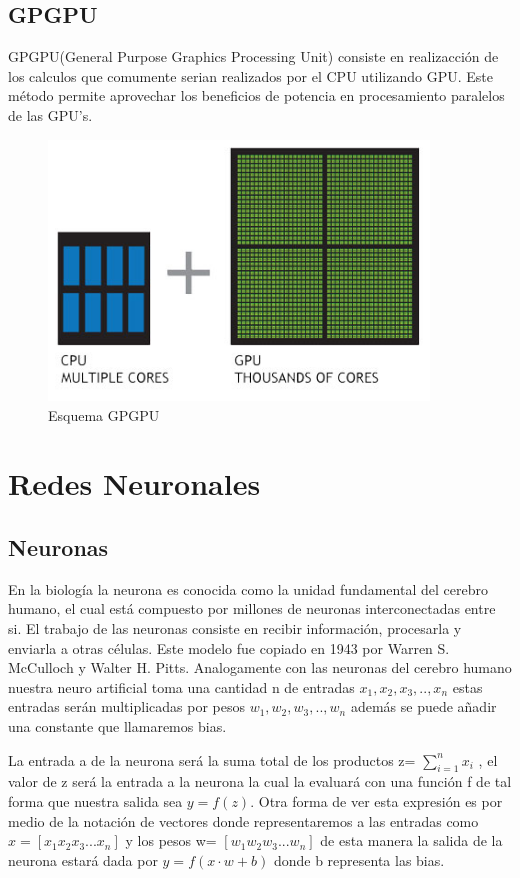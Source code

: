 \subsection{GPGPU} 
GPGPU(General Purpose Graphics Processing Unit) consiste en realizacción de los calculos que comumente serian realizados por el CPU utilizando GPU. Este método permite aprovechar los beneficios de potencia en procesamiento paralelos de las GPU's.
\begin{figure}[H]
	\centering
	\includegraphics[width=0.9\textwidth]{Figures/cpu-and-gpu.jpg}
	\caption{Esquema GPGPU}
	\label{MVC}
\end{figure}



\section{Redes Neuronales}
\subsection{Neuronas}
En la biología la neurona es conocida como la unidad fundamental del cerebro humano, el cual está compuesto por millones de neuronas interconectadas entre si. El trabajo de las neuronas consiste en recibir información, procesarla y enviarla a otras células. Este modelo fue copiado en 1943 por Warren S. McCulloch y Walter H. Pitts. Analogamente con las neuronas del cerebro humano nuestra neuro artificial toma una cantidad n de entradas $x_{1}, x_{2}, x_{3}, .. , x_{n}$ estas entradas serán multiplicadas por pesos $w_{1}, w_{2}, w_{3}, .. , w_{n}$ además se puede añadir una constante que llamaremos bias. 

La entrada a de la neurona será la suma total de los productos z=  $\sum_{i=1}^{n}x_{i}$ , el valor de z será la entrada a la neurona la cual la evaluará con una función f de tal forma que nuestra salida sea $y=f(z)$. Otra forma de ver esta expresión es por medio de la notación de vectores donde representaremos a las entradas como $x= [x_{1}  x_{2}  x_{3}  ...  x_{n}]$ y los pesos w= $[w_{1}  w_{2}  w_{3}  ...  w_{n}]$ de esta manera la salida de la neurona estará dada por $y=f(x\cdot w+b)$ donde b representa las bias. 


